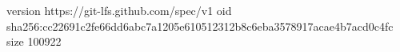 version https://git-lfs.github.com/spec/v1
oid sha256:cc22691c2fe66dd6abc7a1205e610512312b8c6eba3578917acae4b7acd0c4fc
size 100922

